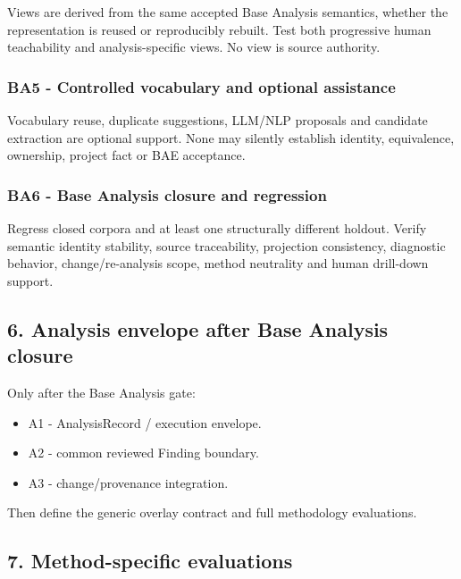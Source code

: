 \documentclass[
  10pt,
  a4paper,
]{article}
\providecommand{\tightlist}{%
  \setlength{\itemsep}{0pt}\setlength{\parskip}{0pt}}
\begin{document}
Views are derived from the same accepted Base Analysis semantics,
whether the representation is reused or reproducibly rebuilt. Test both
progressive human teachability and analysis-specific views. No view is
source authority.

\subsubsection{BA5 - Controlled vocabulary and optional
assistance}\label{ba5---controlled-vocabulary-and-optional-assistance}

Vocabulary reuse, duplicate suggestions, LLM/NLP proposals and candidate
extraction are optional support. None may silently establish identity,
equivalence, ownership, project fact or BAE acceptance.

\subsubsection{BA6 - Base Analysis closure and
regression}\label{ba6---base-analysis-closure-and-regression}

Regress closed corpora and at least one structurally different holdout.
Verify semantic identity stability, source traceability, projection
consistency, diagnostic behavior, change/re-analysis scope, method
neutrality and human drill-down support.

\subsection{6. Analysis envelope after Base Analysis
closure}\label{6-analysis-envelope-after-base-analysis-closure}

Only after the Base Analysis gate:

\begin{itemize}
\tightlist
\item
  A1 - AnalysisRecord / execution envelope.
\item
  A2 - common reviewed Finding boundary.
\item
  A3 - change/provenance integration.
\end{itemize}

Then define the generic overlay contract and full methodology
evaluations.

\subsection{7. Method-specific
evaluations}\label{7-method-specific-evaluations}
\end{document}
